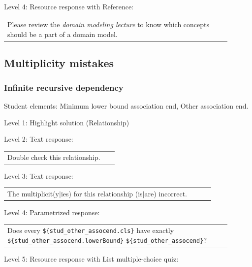 \noindent Level 4: Resource response with Reference: \medskip

\begin{tabular}{|p{0.9\linewidth}}
Please review the \textit{domain modeling lecture} to know which concepts should be a part of a domain model.
\end{tabular} \medskip


\subsection{Multiplicity mistakes}

\subsubsection{Infinite recursive dependency}

Student elements: Minimum lower bound association end, Other association end.  \medskip

\noindent Level 1: Highlight solution (Relationship) \medskip

\noindent Level 2: Text response: \medskip

\begin{tabular}{|p{0.9\linewidth}}
Double check this relationship.
\end{tabular} \medskip

\noindent Level 3: Text response: \medskip

\begin{tabular}{|p{0.9\linewidth}}
The multiplicit(y$|$ies) for this relationship (is$|$are) incorrect.
\end{tabular} \medskip

\noindent Level 4: Parametrized response: \medskip

\begin{tabular}{|p{0.9\linewidth}}
Does every \verb|${stud_other_assocend.cls}| have exactly \verb|${stud_other_assocend.lowerBound}| \verb|${stud_other_assocend}|?
\end{tabular} \medskip

\noindent Level 5: Resource response with List multiple-choice quiz: \medskip

